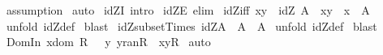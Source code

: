 \begin{isabellebody}
\isamarkupfalse%
\ assumption\isanewline
{}\isamarkupfalse%
\ auto\isanewline
{}\isamarkupfalse%
%
\endisatagproof
{\isafoldproof}%
%
\isadelimproof
\isanewline
%
\endisadelimproof
\isanewline
{}\isamarkupfalse%
\ idZI\ {\isacharbrackleft}intro{\isacharbang}{\isacharbrackright}\isanewline
{}\isamarkupfalse%
\ idZE\ {\isacharbrackleft}elim{\isacharbang}{\isacharbrackright}\isanewline
\isanewline
{}\isamarkupfalse%
\ idZ{\isacharunderscore}iff{\isacharcolon}\ {\isachardoublequoteopen}{\isacharparenleft}{\isacharparenleft}x{\isacharcomma}y{\isacharparenright}\ {\isacharcolon}\ idZ\ A{\isacharparenright}\ {\isacharequal}\ {\isacharparenleft}x{\isacharequal}y\ {\isacharampersand}\ x\ {\isacharcolon}\ A{\isacharparenright}{\isachardoublequoteclose}\isanewline
%
\isadelimproof
%
\endisadelimproof
%
\isatagproof
{}\isamarkupfalse%
\ {\isacharparenleft}unfold\ idZ{\isacharunderscore}def{\isacharparenright}\isanewline
{}\isamarkupfalse%
\ blast\isanewline
{}\isamarkupfalse%
%
\endisatagproof
{\isafoldproof}%
%
\isadelimproof
\isanewline
%
\endisadelimproof
\isanewline
{}\isamarkupfalse%
\ idZ{\isacharunderscore}subset{\isacharunderscore}Times{\isacharcolon}\ {\isachardoublequoteopen}idZ{\isacharparenleft}A{\isacharparenright}\ {\isacharless}{\isacharequal}\ A\ {\isacharless}{\isacharasterisk}{\isachargreater}\ A{\isachardoublequoteclose}\isanewline
%
\isadelimproof
%
\endisadelimproof
%
\isatagproof
{}\isamarkupfalse%
\ {\isacharparenleft}unfold\ idZ{\isacharunderscore}def{\isacharparenright}\isanewline
{}\isamarkupfalse%
\ blast\isanewline
{}\isamarkupfalse%
%
\endisatagproof
{\isafoldproof}%
%
\isadelimproof
%
\endisadelimproof
%
\isamarkuptrue%
\isamarkupfalse%
\ Dom{\isacharunderscore}In{\isacharcolon}\ {\isachardoublequoteopen}x{\isacharcolon}dom\ R\ {\isacharequal}\ {\isacharparenleft}{\isacharquery}\ y{\isachardot}\ y{\isacharcolon}ran{\isacharparenleft}R{\isacharparenright}\ {\isacharampersand}\ {\isacharparenleft}x{\isacharcomma}y{\isacharparenright}{\isacharcolon}R{\isacharparenright}{\isachardoublequoteclose}\isanewline
%
\isadelimproof
%
\endisadelimproof
%
\isatagproof
{}\isamarkupfalse%
\ auto\isanewline
{}\isamarkupfalse%
%
\endisatagproof
{\isafoldproof}%
%
\isadelimproof
\isanewline
%
\endisadelimproof
\isanewline
{}\isamarkupfalse%

\end{isabellebody}
